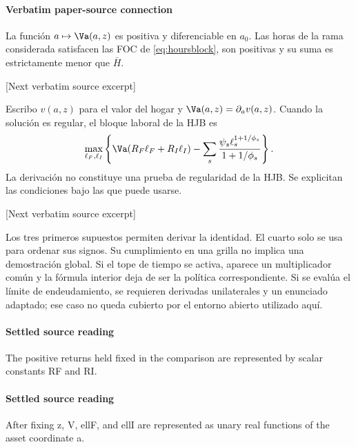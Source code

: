 \documentclass[10pt]{article}
\begin{document}
\paragraph{Verbatim paper-source connection}
\begin{ReviewVerbatim}
\begin{assumption}\label{ass:regular}
La función \(a\mapsto\Va(a,z)\) es positiva y diferenciable en \(a_0\). Las horas de la rama considerada satisfacen las FOC de \eqref{eq:hoursblock}, son positivas y su suma es estrictamente menor que \(\bar H\).
\end{assumption}

[Next verbatim source excerpt]

Escribo \(v(a,z)\) para el valor del hogar y \(\Va(a,z)=\partial_av(a,z)\). Cuando la solución es regular, el bloque laboral de la HJB es
\begin{equation}\label{eq:hoursblock}
\max_{\ell_F,\ell_I}
\left\{\Va(R_F\ell_F+R_I\ell_I)-
\sum_s\frac{\psi_s\ell_s^{1+1/\phi_s}}{1+1/\phi_s}\right\}.
\end{equation}
La derivación no constituye una prueba de regularidad de la HJB. Se explicitan las condiciones bajo las que puede usarse.

[Next verbatim source excerpt]

Los tres primeros supuestos permiten derivar la identidad. El cuarto solo se usa para ordenar sus signos. Su cumplimiento en una grilla no implica una demostración global. Si el tope de tiempo se activa, aparece un multiplicador común y la fórmula interior deja de ser la política correspondiente. Si se evalúa el límite de endeudamiento, se requieren derivadas unilaterales y un enunciado adaptado; ese caso no queda cubierto por el entorno abierto utilizado aquí.
\end{ReviewVerbatim}

\paragraph{Settled source reading}
\begin{sloppypar}
The positive returns held fixed in the comparison are represented by scalar constants RF and RI.\allowbreak{}
\end{sloppypar}
\paragraph{Settled source reading}
\begin{sloppypar}
After fixing z, V, ellF, and ellI are represented as unary real functions of the asset coordinate a.\allowbreak{}
\end{sloppypar}
\end{document}
